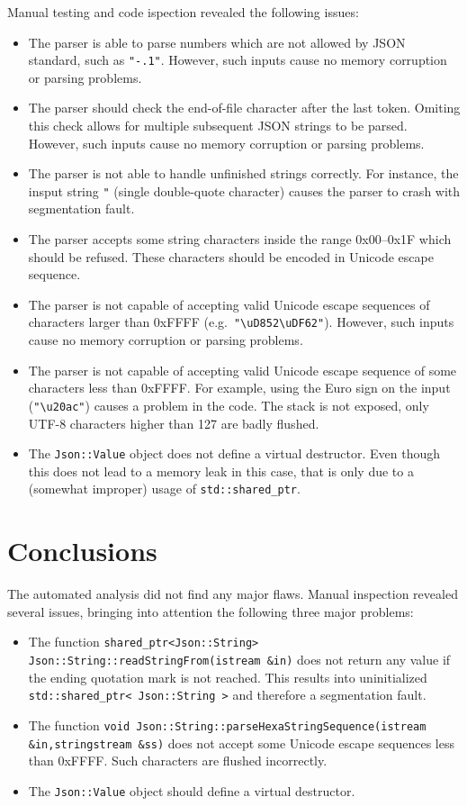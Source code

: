 \documentclass[11pt]{article}
\begin{document}
Manual testing and code ispection revealed the following issues:
\begin{itemize}[itemsep=0pt]
\item The parser is able to parse numbers which are not allowed by JSON standard, such as \texttt{"-.1"}. However, such inputs cause no memory corruption or parsing problems.
\item The parser should check the end-of-file character after the last token. Omiting this check allows for multiple subsequent JSON strings to be parsed. However, such inputs cause no memory corruption or parsing problems.
\item The parser is not able to handle unfinished strings correctly. For instance, the insput string \texttt{"} (single double-quote character) causes the parser to crash with segmentation fault.
\item The parser accepts some string characters inside the range 0x00--0x1F which should be refused. These characters should be encoded in Unicode escape sequence.
\item The parser is not capable of accepting valid Unicode escape sequences of characters larger than 0xFFFF (e.g.\ \texttt{"\textbackslash{}uD852\textbackslash{}uDF62"}). However, such inputs cause no memory corruption or parsing problems.
\item The parser is not capable of accepting valid Unicode escape sequence of some characters less than 0xFFFF. For example, using the Euro sign on the input (\texttt{"\textbackslash{}u20ac"}) causes a problem in the code. The stack is not exposed, only UTF-8 characters higher than 127 are badly flushed.
\item The \texttt{Json::Value} object does not define a virtual destructor. Even though this does not lead to a memory leak in this case, that is only due to a (somewhat improper) usage of \texttt{std::shared\_ptr}.
\end{itemize}

\section{Conclusions}

The automated analysis did not find any major flaws. Manual inspection revealed several issues, bringing into attention the following three major problems:
\begin{itemize}[itemsep=0pt]
\item The function \texttt{shared\_ptr<Json::String> Json::String::readStringFrom(istream \&in)} does not return any value if the ending quotation mark is not reached. This results into uninitialized \texttt{std::shared\_ptr< Json::String >} and therefore a segmentation fault.
\item The function \texttt{void Json::String::parseHexaStringSequence(istream \&in,stringstream \&ss)} does not accept some Unicode escape sequences less than 0xFFFF. Such characters are flushed incorrectly.
\item The \texttt{Json::Value} object should define a virtual destructor.
\end{itemize}
\end{document}
